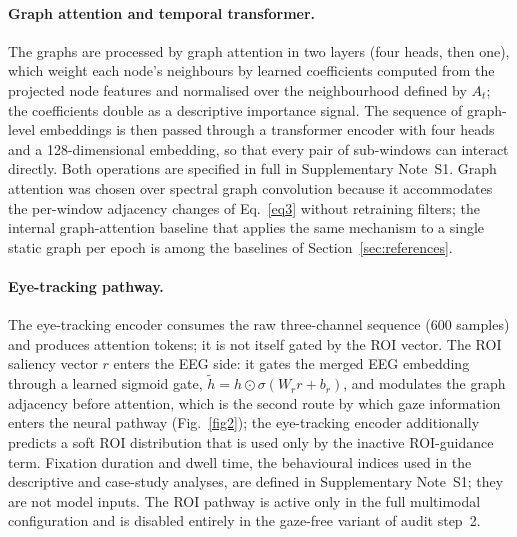\documentclass[pdflatex,sn-basic,Numbered,twocolumn,iicol]{sn-jnl}
\theoremstyle{thmstyleone}%
\theoremstyle{thmstyletwo}%
\theoremstyle{thmstylethree}%
\begin{document}
\paragraph{Graph attention and temporal transformer.} The graphs are processed by graph attention \cite{ref43} in two layers (four heads, then one), which weight each node's neighbours by learned coefficients computed from the projected node features and normalised over the neighbourhood defined by $A_t$; the coefficients double as a descriptive importance signal. The sequence of graph-level embeddings is then passed through a transformer encoder \cite{ref44} with four heads and a 128-dimensional embedding, so that every pair of sub-windows can interact directly. Both operations are specified in full in Supplementary Note~S1. Graph attention was chosen over spectral graph convolution because it accommodates the per-window adjacency changes of Eq.~\eqref{eq3} without retraining filters; the internal graph-attention baseline that applies the same mechanism to a single static graph per epoch is among the baselines of Section~\ref{sec:references}.

\paragraph{Eye-tracking pathway.} The eye-tracking encoder consumes the raw three-channel sequence (600 samples) and produces attention tokens; it is not itself gated by the ROI vector. The ROI saliency vector $r$ enters the EEG side: it gates the merged EEG embedding through a learned sigmoid gate, $\tilde h = h \odot \sigma(W_r r + b_r)$, and modulates the graph adjacency before attention, which is the second route by which gaze information enters the neural pathway (Fig.~\ref{fig2}); the eye-tracking encoder additionally predicts a soft ROI distribution that is used only by the inactive ROI-guidance term. Fixation duration and dwell time, the behavioural indices used in the descriptive and case-study analyses, are defined in Supplementary Note~S1; they are not model inputs. The ROI pathway is active only in the full multimodal configuration and is disabled entirely in the gaze-free variant of audit step~2.
\end{document}
